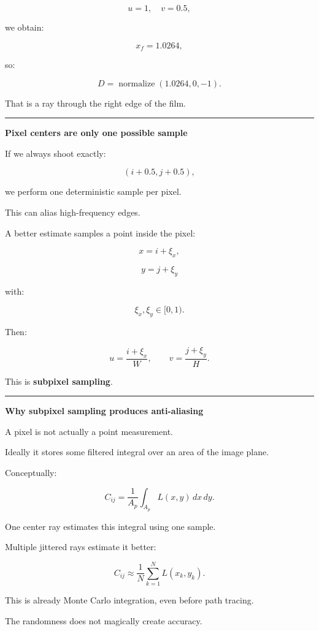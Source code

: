 \[
u=1,
\quad
v=0.5,
\]

we obtain:

\[
x_f=1.0264,
\]

so:

\[
D
=
\operatorname{normalize}
(1.0264,0,-1).
\]

That is a ray through the right edge of the film.

\begin{center}\rule{0.5\linewidth}{0.5pt}\end{center}

\textbf{Pixel centers are only one possible sample}

If we always shoot exactly:

\[
(i+0.5,j+0.5),
\]

we perform one deterministic sample per pixel.

This can alias high-frequency edges.

A better estimate samples a point inside the pixel:

\[
x=i+\xi_x,
\]

\[
y=j+\xi_y
\]

with:

\[
\xi_x,\xi_y\in[0,1).
\]

Then:

\[
u=
\frac{i+\xi_x}{W},
\qquad
v=
\frac{j+\xi_y}{H}.
\]

This is \textbf{subpixel sampling}.

\begin{center}\rule{0.5\linewidth}{0.5pt}\end{center}

\textbf{Why subpixel sampling produces anti-aliasing}

A pixel is not actually a point measurement.

Ideally it stores some filtered integral over an area of the image plane.

Conceptually:

\[
C_{ij}
=
\frac{1}{A_p}
\int_{A_p}
L(x,y)
\,dx\,dy.
\]

One center ray estimates this integral using one sample.

Multiple jittered rays estimate it better:

\[
\boxed{
C_{ij}
\approx
\frac1N
\sum_{k=1}^{N}
L(x_k,y_k).
}
\]

This is already Monte Carlo integration, even before path tracing.

The randomness does not magically create accuracy.

